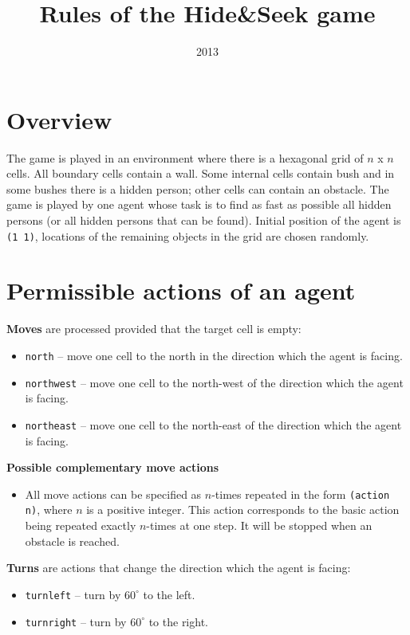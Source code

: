 \documentclass[a4paper,12pt]{article}
\title{Rules of the Hide\&Seek game}
\author{}
\date{2013}
\begin{document}
\maketitle

\section*{Overview}

The game is played in an environment where there is a hexagonal grid of $n$ x $n$ cells. All boundary cells
contain a wall. Some internal cells contain bush and in some bushes there is a hidden person; other cells can contain an
obstacle. The game is played by one agent whose task is to find as fast as possible all hidden persons (or all hidden
persons that can be found). Initial position of  the agent is \texttt{(1 1)}, locations of the remaining objects in the
grid are chosen randomly.

\section*{Permissible actions of an agent}

\textbf{Moves} are processed provided that the target cell is empty:

\begin{itemize}
\item \texttt{north} -- move one cell to the north in the direction which the agent is facing.
\item \texttt{northwest} -- move one cell to the  north-west of the direction which the agent is facing.
\item \texttt{northeast} -- move one cell to the north-east of the direction which the agent is facing.
\end{itemize}

\textbf{Possible complementary move actions}
\begin{itemize}
\item All move actions can be specified as $n$-times repeated in the form \texttt{(action n)}, where $n$ is a positive
integer. This action corresponds to the basic action being repeated exactly $n$-times at one step. It will be stopped
when an obstacle is reached.
\end{itemize}

\textbf{Turns} are actions that change the direction which the agent is facing:
\begin{itemize}
\item \texttt{turnleft} -- turn by $60^\circ$ to the left.
\item \texttt{turnright} -- turn by $60^\circ$ to the right.
\end{itemize}
\end{document}

